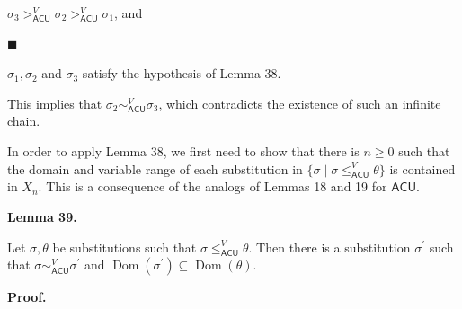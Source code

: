 $\sigma_{3}>_{\mathsf{ACU}}^{V}\sigma_{2}>_{\mathsf{ACU}}^{V}\sigma_{1}$, and\par
 
 
 
\par\noindent  $\blacksquare$ 
 
$\sigma_{1},\sigma_{2}$ and $\sigma_{3}$ satisfy the hypothesis of Lemma 38.\par
 
 
  
This implies that $\sigma_{2}\sim_{\mathsf{ACU}}^{V}\sigma_{3}$, which contradicts the existence of such an infinite chain.\par
 
 
 
In order to apply Lemma 38, we first need to show that there is $n\geq 0$ such that the domain and variable range of each substitution in $\{\sigma\mid\sigma\leq_{\mathsf{ACU}}^{V}\theta\}$ is contained in $X_{n}$. This is a consequence of the analogs of Lemmas 18 and 19 for $\mathsf{ACU}$.\par
 
 
 
\par\medskip\noindent\textbf{Lemma 39.}\par
 
 
Let $\sigma,\theta$ be substitutions such that $\sigma\leq_{\mathsf{ACU}}^{V}\theta$. Then there is a substitution $\sigma^{\prime}$ such that $\sigma\sim_{\mathsf{ACU}}^{V}\sigma^{\prime}$ and $\operatorname{Dom}(\sigma^{\prime})\subseteq\operatorname{Dom}(\theta)$.\par
 
 
 
 
 
\par\medskip\noindent\textbf{Proof.}\par
 
 
